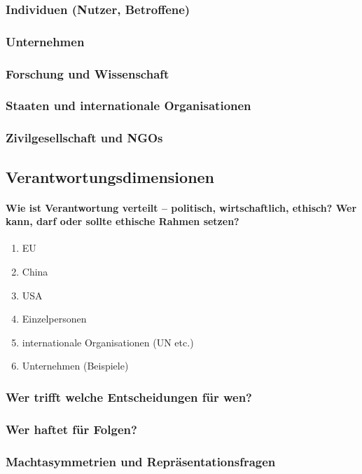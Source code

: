 {\subsubsection{Individuen (Nutzer, Betroffene)}
\subsubsection{Unternehmen}
\subsubsection{Forschung und Wissenschaft}
\subsubsection{Staaten und internationale Organisationen}
\subsubsection{Zivilgesellschaft und NGOs}


\subsection{Verantwortungsdimensionen}
\paragraph{Wie ist Verantwortung verteilt – politisch, wirtschaftlich, ethisch? 
Wer kann, darf oder sollte ethische Rahmen setzen?}

\begin{enumerate}
    \item EU
    \item China
    \item USA
    \item Einzelpersonen
    \item internationale Organisationen (UN etc.)
    \item Unternehmen (Beispiele)
\end{enumerate}
 

\subsubsection{Wer trifft welche Entscheidungen für wen?}
\subsubsection{Wer haftet für Folgen?}
\subsubsection{Machtasymmetrien und Repräsentationsfragen}


}
